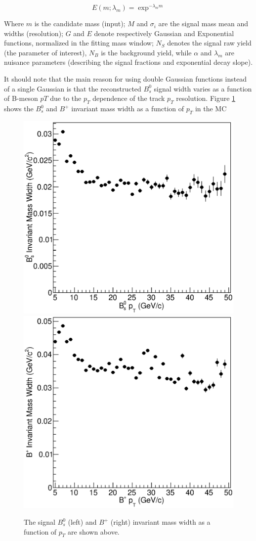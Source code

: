\begin{equation}
E(m;\lambda_m) = \exp^{-\lambda_m m}
\end{equation}

Where $m$ is the candidate mass (input); $M$ and $\sigma_i$ are the signal mass mean and widths (resolution); $G$ and $E$ denote respectively Gaussian and Exponential functions, normalized in the fitting mass window; $N_S$ denotes the signal raw yield (the parameter of interest),  $N_B$ is the background yield, while $\alpha$ and $\lambda_m$ are nuisance parameters (describing the signal fractions and exponential decay slope). %

It should note that the main reason for using double Gaussian functions instead of a single Gaussian is that the reconstructed $B^0_s$ signal width varies as a function of B-meson $pT$ due to the $p_T$ dependence of the track $p_T$ resolution. Figure \ref{BsBPWidthPT} shows the $B^0_s$ and $B^+$ invariant mass width as a function of $p_T$ in the MC


\begin{figure}[ht!]
\centering
\includegraphics[width=0.48\linewidth]{Figures/Chapter5/BsHisPtWidth.eps}
\includegraphics[width=0.48\linewidth]{Figures/Chapter5/BPHisPtWidth.eps}
\caption{The signal $B^0_s$ (left) and $B^+$ (right) invariant mass width as a function of $p_T$ are shown above.}
\label{BsBPWidthPT}
\end{figure}


